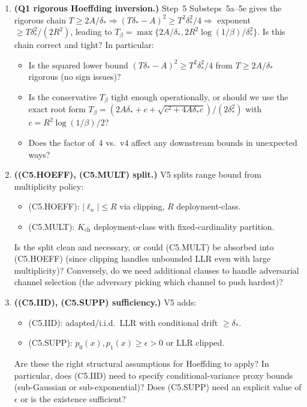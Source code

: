\documentclass{article}
\newcommand{\deltastar}{\delta_{*}}
\newcommand{\Tbeta}{T_{\beta}}
\begin{document}
\begin{enumerate}
\item \textbf{(Q1 rigorous Hoeffding inversion.)}  Step~5
  Substeps~5a--5e gives the rigorous chain $T \geq 2A/\deltastar
  \Rightarrow (T\deltastar - A)^2 \geq T^2\deltastar^2/4 \Rightarrow$
  exponent $\geq T\deltastar^2/(2R^2)$, leading to $\Tbeta =
  \max\{2A/\deltastar, 2R^2\log(1/\beta)/\deltastar^2\}$.  Is this
  chain correct and tight?  In particular:
  \begin{itemize}
  \item Is the squared lower bound $(T\deltastar - A)^2 \geq
    T^2\deltastar^2/4$ from $T \geq 2A/\deltastar$ rigorous (no
    sign issues)?
  \item Is the conservative $\Tbeta$ tight enough operationally,
    or should we use the exact root form
    $\Tbeta = (2A\deltastar + c + \sqrt{c^2 + 4A\deltastar c}) /
    (2\deltastar^2)$ with $c = R^2\log(1/\beta)/2$?
  \item Does the factor of~4 vs.\ v4 affect any downstream bounds
    in unexpected ways?
  \end{itemize}

\item \textbf{((C5.HOEFF), (C5.MULT) split.)}  V5 splits range
  bound from multiplicity policy:
  \begin{itemize}
  \item (C5.HOEFF): $|\ell_n| \leq R$ via clipping, $R$
    deployment-class.
  \item (C5.MULT): $K_{\mathrm{ch}}$ deployment-class with
    fixed-cardinality partition.
  \end{itemize}
  Is the split clean and necessary, or could (C5.MULT) be absorbed
  into (C5.HOEFF) (since clipping handles unbounded LLR even with
  large multiplicity)?  Conversely, do we need additional clauses
  to handle adversarial channel selection (the adversary picking
  which channel to push hardest)?

\item \textbf{((C5.IID), (C5.SUPP) sufficiency.)}  V5 adds:
  \begin{itemize}
  \item (C5.IID): adapted/i.i.d.\ LLR with conditional drift
    $\geq \deltastar$.
  \item (C5.SUPP): $p_0(x), p_1(x) \geq \epsilon > 0$ or LLR
    clipped.
  \end{itemize}
  Are these the right structural assumptions for Hoeffding to
  apply?  In particular, does (C5.IID) need to specify
  conditional-variance proxy bounds (sub-Gaussian or
  sub-exponential)?  Does (C5.SUPP) need an explicit value of
  $\epsilon$ or is the existence sufficient?


\end{enumerate}
\end{document}
